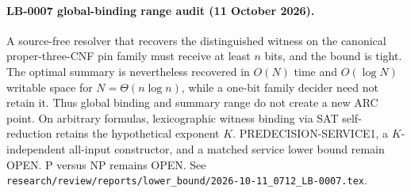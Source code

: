 \paragraph{LB-0007 global-binding range audit (11 October 2026).}
A source-free resolver that recovers the distinguished witness on the
canonical proper-three-CNF pin family must receive at least $n$ bits, and the
bound is tight.  The optimal summary is nevertheless recovered in $O(N)$
time and $O(\log N)$ writable space for $N=\Theta(n\log n)$, while a one-bit
family decider need not retain it.  Thus global binding and summary range do
not create a new ARC point.  On arbitrary formulas, lexicographic witness
binding via SAT self-reduction retains the hypothetical exponent $K$.
PREDECISION-SERVICE1, a $K$-independent all-input constructor, and a matched
service lower bound remain OPEN.  P versus NP remains OPEN.  See
\texttt{research/review/reports/lower\_bound/2026-10-11\_0712\_LB-0007.tex}.

